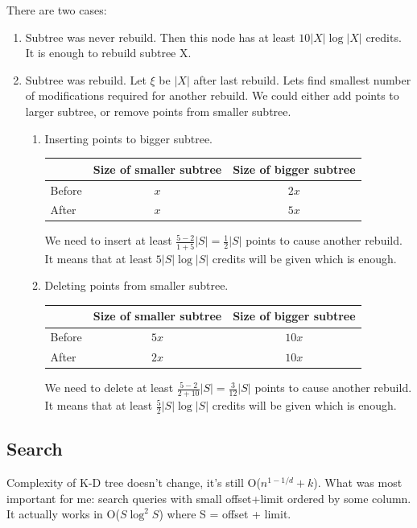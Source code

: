 \documentclass[10pt,a4paper]{article}
\begin{document}
There are two cases:
\begin{enumerate}
\item Subtree was never rebuild. Then this node has at least $10 |X| \log |X|$ credits. It is enough to rebuild subtree X.
\item Subtree was rebuild. Let $\xi$ be $|X|$ after last rebuild. Lets find smallest number of modifications required for another rebuild. We could either add points to larger subtree, or remove points from smaller subtree.
\begin{enumerate}
\item Inserting points to bigger subtree.

\begin{tabular}{|l|c|c|}
\hline  & Size of smaller subtree & Size of bigger subtree  \\
\hline Before & $x$ & $2x$ \\
\hline After & $x$ & $5x$ \\
\hline 
\end{tabular}

We need to insert at least $ \frac{5 - 2}{1 + 5} |S| = \frac{1}{2} |S|$ points to cause another rebuild. It means that at least $5 |S| \log |S|$ credits will be given which is enough. 

\bigskip
\item Deleting points from smaller subtree.

\begin{tabular}{|l|c|c|}
\hline  & Size of smaller subtree & Size of bigger subtree  \\
\hline Before & $5x$ & $10x$ \\
\hline After & $2x$ & $10x$ \\
\hline 
\end{tabular}

We need to delete at least $\frac{5 - 2}{2 + 10} |S| = \frac{3}{12} |S|$ points to cause another rebuild. It means that at least $\frac{5}{2} |S| \log |S|$ credits will be given which is enough. 

\end{enumerate}
\end{enumerate}

\subsection{Search}
Complexity of K-D tree doesn't change, it's still O($n^{1-1/d} + k$). What was most important for me: search queries with small offset+limit ordered by some column. It actually works in O($S \log^2 S$) where S = offset + limit. 
\end{document}
